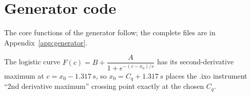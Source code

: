 \section{Generator code}
The core functions of the generator follow; the complete files are in Appendix~\ref{app:generator}.


The logistic curve $F(c)=B+\dfrac{A}{1+e^{-(c-x_0)/s}}$ has its second-derivative maximum at $c=x_0-1.317\,s$, so
$x_0=C_q+1.317\,s$ places the .ixo instrument ``2nd derivative maximum'' crossing point exactly at the chosen $C_q$.







